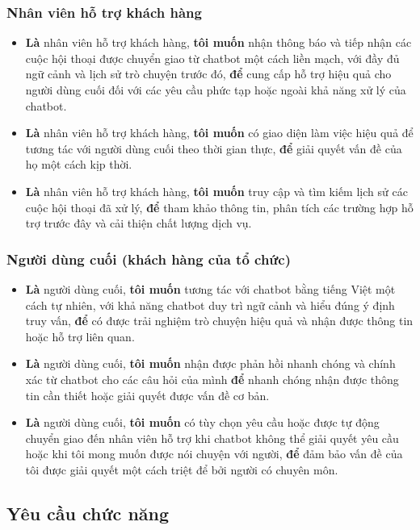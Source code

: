\subsubsection{Nhân viên hỗ trợ khách hàng}
\begin{itemize}
    \item \textbf{Là} nhân viên hỗ trợ khách hàng, \textbf{tôi muốn} nhận thông báo và tiếp nhận các cuộc hội thoại được chuyển giao từ chatbot một cách liền mạch, với đầy đủ ngữ cảnh và lịch sử trò chuyện trước đó, \textbf{để} cung cấp hỗ trợ hiệu quả cho người dùng cuối đối với các yêu cầu phức tạp hoặc ngoài khả năng xử lý của chatbot.
    \item \textbf{Là} nhân viên hỗ trợ khách hàng, \textbf{tôi muốn} có giao diện làm việc hiệu quả để tương tác với người dùng cuối theo thời gian thực, \textbf{để} giải quyết vấn đề của họ một cách kịp thời.
    \item \textbf{Là} nhân viên hỗ trợ khách hàng, \textbf{tôi muốn} truy cập và tìm kiếm lịch sử các cuộc hội thoại đã xử lý, \textbf{để} tham khảo thông tin, phân tích các trường hợp hỗ trợ trước đây và cải thiện chất lượng dịch vụ.
\end{itemize}

\subsubsection{Người dùng cuối (khách hàng của tổ chức)}
\begin{itemize}
    \item \textbf{Là} người dùng cuối, \textbf{tôi muốn} tương tác với chatbot bằng tiếng Việt một cách tự nhiên, với khả năng chatbot duy trì ngữ cảnh và hiểu đúng ý định truy vấn, \textbf{để} có được trải nghiệm trò chuyện hiệu quả và nhận được thông tin hoặc hỗ trợ liên quan.
    \item \textbf{Là} người dùng cuối, \textbf{tôi muốn} nhận được phản hồi nhanh chóng và chính xác từ chatbot cho các câu hỏi của mình \textbf{để} nhanh chóng nhận được thông tin cần thiết hoặc giải quyết được vấn đề cơ bản.
    \item \textbf{Là} người dùng cuối, \textbf{tôi muốn} có tùy chọn yêu cầu hoặc được tự động chuyển giao đến nhân viên hỗ trợ khi chatbot không thể giải quyết yêu cầu hoặc khi tôi mong muốn được nói chuyện với người, \textbf{để} đảm bảo vấn đề của tôi được giải quyết một cách triệt để bởi người có chuyên môn.
\end{itemize}


\subsection{Yêu cầu chức năng}

